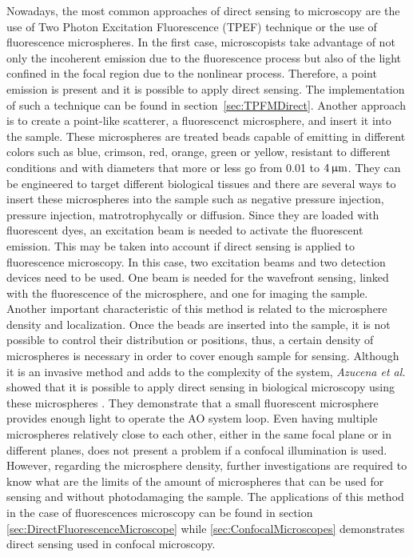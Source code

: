 Nowadays, the most common approaches of direct sensing to microscopy are the use of Two Photon Excitation Fluorescence (TPEF) technique or the use of fluorescence microspheres. In the first case, microscopists take advantage of not only the incoherent emission due to the fluorescence process but also of the light confined in the focal region due to the nonlinear process. Therefore, a point emission is present and it is possible to apply direct sensing. The implementation of such a technique can be found in section~\ref{sec:TPFMDirect}. Another approach is to create a point-like scatterer, a fluorescenct microsphere, and insert it into the sample. These microspheres are treated beads capable of emitting in different colors such as blue, crimson, red, orange, green or yellow, resistant to different conditions and with diameters that more or less go from 0.01 to $\unit[4]{\upmu m}$. They can be engineered to target different biological tissues and there are several ways to insert these microspheres into the sample such as negative pressure injection, pressure injection, matrotrophycally or diffusion. Since they are loaded with fluorescent dyes, an excitation beam is needed to activate the fluorescent emission. This may be taken into account if direct sensing is applied to fluorescence microscopy. In this case, two excitation beams and two detection devices need to be used. One beam is needed  for the wavefront sensing, linked with the fluorescence of the microsphere, and one for imaging the sample. Another important characteristic of this method is related to the microsphere density and localization. Once the beads are inserted into the sample, it is not possible to control their distribution or positions, thus, a certain density of microspheres is necessary in order to cover enough sample for sensing. Although it is an invasive method and adds to the complexity of the system, \emph{Azucena et al.} showed that it is possible to apply direct sensing in biological microscopy using these microspheres \cite{wide_fluorescence_guide_star}. They demonstrate that a small fluorescent microsphere provides enough light to operate the AO system loop. Even having multiple microspheres relatively close to each other, either in the same focal plane or in different planes, does not present a problem if a confocal illumination is used. However, regarding the microsphere density, further investigations are required to know what are the limits of the amount of microspheres that can be used for sensing and without photodamaging the sample. The applications of this method in the case of fluorescences microscopy can be found in section \ref{sec:DirectFluorescenceMicroscope} while \ref{sec:ConfocalMicroscopes} demonstrates direct sensing used in confocal microscopy.        

